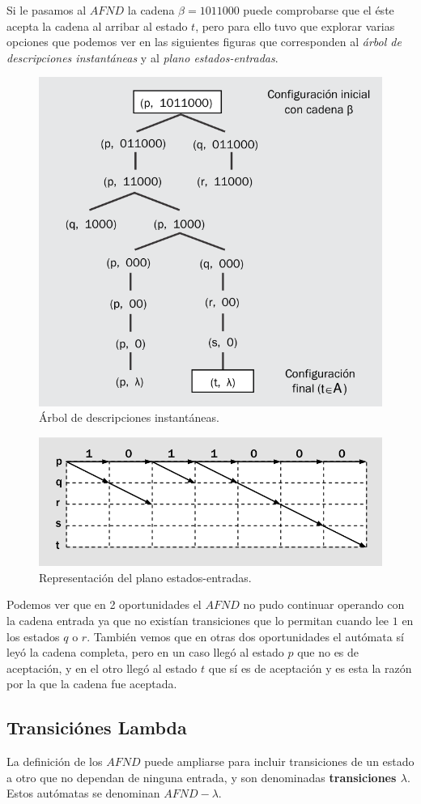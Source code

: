 \documentclass[12pt]{article}
\begin{document}
Si le pasamos al $ AFND $ la cadena $ \beta=1011000 $ puede comprobarse que el éste acepta la cadena al arribar al estado $ t $, pero para ello tuvo que explorar varias opciones que podemos ver en las siguientes figuras que corresponden al \textit{árbol de descripciones instantáneas} y al \textit{plano estados-entradas}.

\begin{figure}[H]
  \centering
  \includegraphics[width=0.5\linewidth]{imagenes/arbol_afnd.png}
  \caption{Árbol de descripciones instantáneas.}
  \label{fig:arbol_afnd}
\end{figure}
\begin{figure}[H]
  \centering
  \includegraphics[width=0.5\linewidth]{imagenes/plano_afnd.png}
  \caption{Representación del plano estados-entradas.}
  \label{fig:plano_afnd}
\end{figure}

Podemos ver que en 2 oportunidades el $ AFND $ no pudo continuar operando con la cadena entrada ya que no existían transiciones que lo permitan cuando lee $ 1 $ en los estados $ q $ o $ r $. También vemos que en otras dos oportunidades el autómata sí leyó la cadena completa, pero en un caso llegó al estado $ p $ que no es de aceptación, y en el otro llegó al estado $ t $ que sí es de aceptación y es esta la razón por la que la cadena fue aceptada.

\subsection{Transiciónes Lambda}
La definición de los $ AFND $ puede ampliarse para incluir transiciones de un estado a otro que no dependan de ninguna entrada, y son denominadas \textbf{transiciones $ \lambda $}. Estos autómatas se denominan $ AFND-\lambda $.
\end{document}

